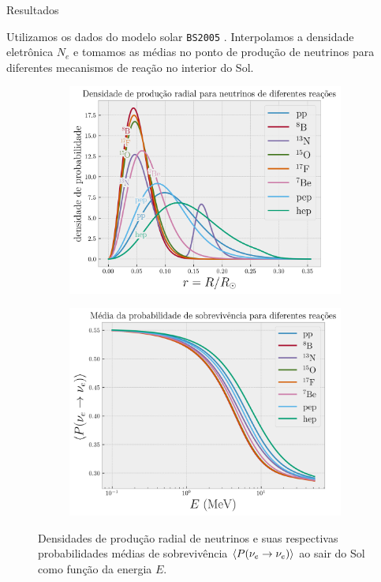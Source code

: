 \documentclass[aspectratio=169]{beamer}
\begin{document}
\begin{frame}{Resultados}

Utilizamos os dados do modelo solar \texttt{BS2005} \cite{bahcall}. Interpolamos a densidade eletrônica $N_e$ e tomamos as médias no ponto de produção de neutrinos para diferentes mecanismos de reação no interior do Sol.

\begin{figure}[H]
\centering
\begin{subfigure}{.5\textwidth}
  \centering
  \includegraphics[width=0.89\linewidth]{fig/raio.png}
  \label{fig:raio}
\end{subfigure}%
\begin{subfigure}{.5\textwidth}
  \centering
  \includegraphics[width=0.89\linewidth]{fig/surv_prob.png}
  \label{fig:surv_prob}
\end{subfigure}
\caption{Densidades de produção radial de neutrinos e suas respectivas probabilidades médias de sobrevivência $\ev{P(\nu_e \to \nu_e)}$ ao sair do Sol como função da energia $E$.}
\label{fig:resultados}
\end{figure}

\end{frame}
\end{document}
